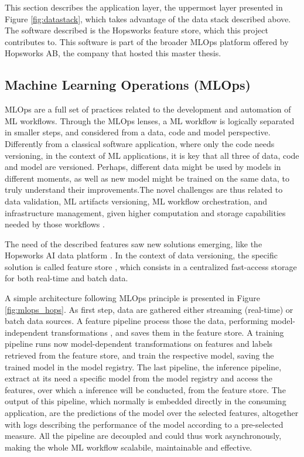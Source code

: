 This section describes the application layer, the uppermost layer presented in Figure \ref{fig:datastack}, which takes advantage of the data stack described above. The software described is the Hopsworks feature store, which this project contributes to. This software is part of the broader \gls{MLOps} platform offered by Hopsworks AB, the company that hosted this master thesis.


\subsection{Machine Learning Operations (MLOps)}
\label{subsec:back_mlops}

\gls{MLOps} are a full set of practices related to the development and automation of \gls{ML} workflows. Through the \gls{MLOps} lenses, a \gls{ML} workflow is logically separated in smaller steps, and considered from a data, code and model perspective. Differently from a classical software application, where only the code needs versioning, in the context of \gls{ML} applications, it is key that all three of data, code and model are versioned. Perhaps, different data might be used by models in different moments, as well as new model might be trained on the same data, to truly understand their improvements.The novel challenges are thus related to data validation, \gls{ML} artifacts versioning, \gls{ML} workflow orchestration, and infrastructure management, given higher computation and storage capabilities needed by those workflows \cite{SurgeAI2024,PDFBigData2024}.

The need of the described features saw new solutions emerging, like the Hopsworks AI data platform \cite{HopsworksRealtimeAI}. In the context of data versioning, the specific solution is called feature store \cite{MeetMichelangeloUbers2017}, which consists in a centralized fast-access storage for both real-time and batch data.

A simple architecture following \gls{MLOps} principle is presented in Figure \ref{fig:mlops_hops}. As first step, data are gathered either streaming (real-time) or batch data sources. A feature pipeline process those the data, performing model-independent transformations \cite{BigDictionaryMLOps2024}, and saves them in the feature store. A training pipeline runs now model-dependent transformations on features and labels retrieved from the feature store, and train the respective model, saving the trained model in the model registry. The last pipeline, the inference pipeline, extract at its need a specific model from the model registry and access the features, over which a inference will be conducted, from the feature store. The output of this pipeline, which normally is embedded directly in the consuming application, are the predictions of the model over the selected features, altogether with logs describing the performance of the model according to a pre-selected measure. All the pipeline are decoupled and could thus work asynchronously, making the whole \gls{ML} workflow scalabile, maintainable and effective.

